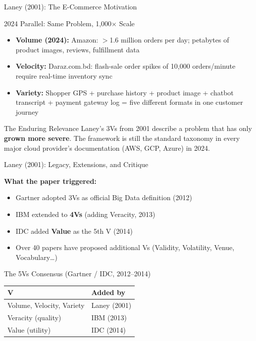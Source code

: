 \documentclass[aspectratio=169,10pt]{beamer}
\begin{document}
\begin{frame}{Laney (2001): The E-Commerce Motivation}
   
      \begin{exampleblock}{2024 Parallel: Same Problem, 1{,}000$\times$ Scale}
        \begin{itemize}
          \item \textbf{Volume (2024):} Amazon: $>$1.6 million orders per day; petabytes of product images, reviews, fulfillment data
          \item \textbf{Velocity:} Daraz.com.bd: flash-sale order spikes of 10{,}000 orders/minute require real-time inventory sync
          \item \textbf{Variety:} Shopper GPS + purchase history + product image + chatbot transcript + payment gateway log = five different formats in one customer journey
        \end{itemize}
      \end{exampleblock}
      \vspace{4pt}
      \begin{alertblock}{The Enduring Relevance}
        Laney's 3Vs from 2001 describe a problem that has only \textbf{grown more severe}. The framework is still the standard taxonomy in every major cloud provider's documentation (AWS, GCP, Azure) in 2024.
      \end{alertblock}
 
\end{frame}

\begin{frame}{Laney (2001): Legacy, Extensions, and Critique}
 
      \textbf{What the paper triggered:}
      \begin{itemize}
        \item Gartner adopted 3Vs as official Big Data definition (2012)
        \item IBM extended to \textbf{4Vs} (adding Veracity, 2013)
        \item IDC added \textbf{Value} as the 5th V (2014)
        \item Over 40 papers have proposed additional Vs (Validity, Volatility, Venue, Vocabulary\ldots)
      \end{itemize}
      \vspace{6pt}
      \begin{exampleblock}{The 5Vs Consensus (Gartner / IDC, 2012--2014)}
        \small
        \begin{tabular}{ll}
          \toprule
          V & Added by \\
          \midrule
          Volume, Velocity, Variety & Laney (2001) \\
          Veracity (quality) & IBM (2013) \\
          Value (utility) & IDC (2014) \\
          \bottomrule
        \end{tabular}
      \end{exampleblock}

\end{frame}
\end{document}
